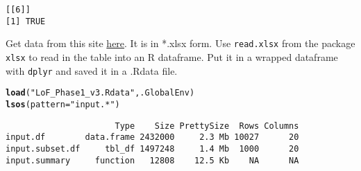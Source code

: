 \documentclass[9pt,english]{extarticle}\usepackage[]{graphicx}\usepackage[]{color}
\makeatletter
\newcommand{\hlstr}[1]{\textcolor[rgb]{0.192,0.494,0.8}{#1}}%
\newcommand{\hlstd}[1]{\textcolor[rgb]{0.345,0.345,0.345}{#1}}%
\newcommand{\hlkwc}[1]{\textcolor[rgb]{0.333,0.667,0.333}{#1}}%
\newcommand{\hlkwd}[1]{\textcolor[rgb]{0.737,0.353,0.396}{\textbf{#1}}}%
\newenvironment{kframe}{%
 \def\at@end@of@kframe{}%
 \ifinner\ifhmode%
  \def\at@end@of@kframe{\end{minipage}}%
  \begin{minipage}{\columnwidth}%
 \fi\fi%
 \def\FrameCommand##1{\hskip\@totalleftmargin \hskip-\fboxsep
 \colorbox{shadecolor}{##1}\hskip-\fboxsep
     \hskip-\linewidth \hskip-\@totalleftmargin \hskip\columnwidth}%
 \MakeFramed {\advance\hsize-\width
   \@totalleftmargin\z@ \linewidth\hsize
   \@setminipage}}%
 {\par\unskip\endMakeFramed%
 \at@end@of@kframe}
\newenvironment{knitrout}{}{} %
\makeatother
\begin{document}
\begin{linenumbers}
\begin{knitrout}
\begin{kframe}
\begin{verbatim}
[[6]]
[1] TRUE
\end{verbatim}
\end{kframe}
\end{knitrout}

Get data from this site \href{http://goo.gl/nB0gAH}{here}. It is in *.xlsx form. Use \verb|read.xlsx| from the package \verb|xlsx| to read in the table into an R dataframe. Put it in a wrapped dataframe with \verb|dplyr| and saved it in a .Rdata file.
\begin{knitrout}
\color{fgcolor}\begin{kframe}
\begin{alltt}
\hlkwd{load}\hlstd{(}\hlstr{"LoF_Phase1_v3.Rdata"}\hlstd{, .GlobalEnv)}
\hlkwd{lsos}\hlstd{(}\hlkwc{pattern}\hlstd{=}\hlstr{"input.*"}\hlstd{)}
\end{alltt}
\begin{verbatim}
                      Type    Size PrettySize  Rows Columns
input.df        data.frame 2432000     2.3 Mb 10027      20
input.subset.df     tbl_df 1497248     1.4 Mb  1000      20
input.summary     function   12808    12.5 Kb    NA      NA
\end{verbatim}
\end{kframe}
\end{knitrout}



\end{linenumbers}
\end{document}

